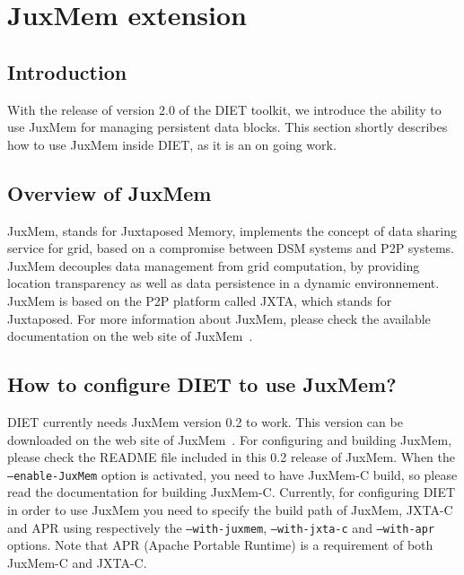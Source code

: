 
\chapter{JuxMem extension}
\label{ch:juxmem}

\section{Introduction}

With the release of version 2.0 of the DIET toolkit, we introduce the
ability to use JuxMem for managing persistent data blocks. This
section shortly describes how to use JuxMem inside DIET, as it is an
on going work.

\section{Overview of JuxMem}

JuxMem, stands for Juxtaposed Memory, implements the concept of data
sharing service for grid, based on a compromise between DSM systems
and P2P systems. JuxMem decouples data management from grid
computation, by providing location transparency as well as data
persistence in a dynamic environnement. JuxMem is based on the P2P
platform called JXTA, which stands for Juxtaposed. For more
information about JuxMem, please check the available documentation on
the web site of JuxMem~\cite{JuxMem}.

\section{How to configure DIET to use JuxMem?}

DIET currently needs JuxMem version 0.2 to work. This version can be
downloaded on the web site of JuxMem~\cite{JuxMem}. For configuring
and building JuxMem, please check the README file included in this
0.2 release of JuxMem. When the \texttt{--enable-JuxMem} option is
activated, you need to have JuxMem-C build, so please read the
documentation for building JuxMem-C. Currently, for configuring DIET
in order to use JuxMem you need to specify the build path of JuxMem,
JXTA-C and APR using respectively the \texttt{--with-juxmem},
\texttt{--with-jxta-c} and \texttt{--with-apr} options.
Note that APR (Apache Portable Runtime) is a requirement of both
JuxMem-C and JXTA-C.

